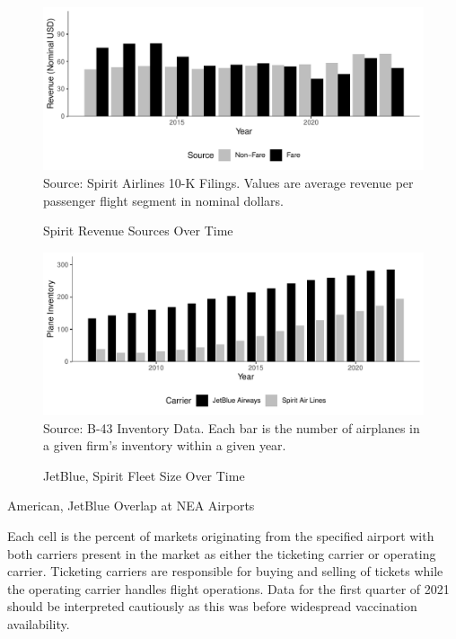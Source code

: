 \documentclass{article}
\begin{document}
\begin{figure}[h]
\caption{Spirit Revenue Sources Over Time}
\label{fig:Spirit_Revenue_Sources}
    \includegraphics[width = \linewidth]{05.Figures/Spirit_Revenue_Sources.pdf}
\footnotesize{Source: Spirit Airlines 10-K Filings. Values are average revenue per passenger flight segment in nominal dollars. }
\end{figure}

    	\begin{figure}[h]
	\caption{JetBlue, Spirit Fleet Size Over Time}
	\label{fig:Both_fleet}
	\includegraphics[width = \linewidth]{Both_Planes.pdf}
	\footnotesize{Source: B-43 Inventory Data. Each bar is the number of airplanes in a given firm's inventory within a given year.}
\end{figure}


\begin{table}[h]
		\caption{American, JetBlue Overlap at NEA Airports}
		\label{tab:NEA_Airport_Presence}
        \vspace{-15mm}
        \begin{center}
         
        \end{center}
                \vspace{-5mm}
		\footnotesize{Each cell is the percent of markets originating from the specified airport with both carriers present in the market as either the ticketing carrier or operating carrier. Ticketing carriers are responsible for buying and selling of tickets while the operating carrier handles flight operations. Data for the first quarter of 2021 should be interpreted cautiously as this was before widespread vaccination availability.}
\end{table}
\end{document}
